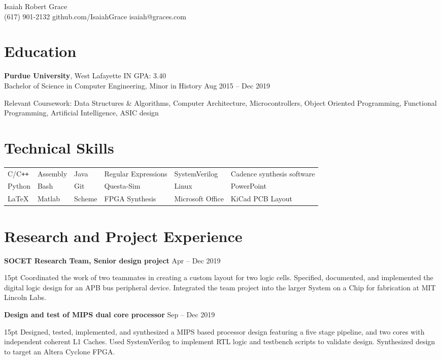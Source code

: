\documentclass[10pt,letterpaper]{article}
\newcommand{\resumeItem}[3]{
	\textbf{#1} \hfill #2\\
	\begin{adjustwidth}{15pt}{}
	#3
	\end{adjustwidth}
}
\begin{document}
\raggedright
\begin{center}
	\Huge{Isaiah Robert Grace}\\
	\vspace{6pt}
	\large{(617) 901-2132 \hfill github.com/IsaiahGrace \hfill isaiah@graces.com}
\end{center}

\section*{Education}
\textbf{Purdue University}, West Lafayette IN \hfill GPA: 3.40\\
Bachelor of Science in Computer Engineering, Minor in History \hfill Aug 2015 -- Dec 2019

\vspace{2pt}
Relevant Coursework:
Data Structures \& Algorithms,
Computer Architecture,
Microcontrollers,
Object Oriented Programming,
Functional Programming,
Artificial Intelligence,
ASIC design


\section*{Technical Skills}
\begin{tabular*}{\textwidth}{llllll}
	C/C\texttt{++} & Assembly & Java   & Regular Expressions & SystemVerilog    & Cadence synthesis software\\
 	Python         & Bash     & Git    & Questa-Sim          & Linux            & PowerPoint\\
 	\LaTeX         & Matlab   & Scheme & FPGA Synthesis      & Microsoft Office & KiCad PCB Layout\\
\end{tabular*}


\section*{Research and Project Experience}
\resumeItem
{SOCET Research Team, Senior design project}
{Apr -- Dec 2019}
{Coordinated the work of two teammates in creating a custom layout for two logic cells. Specified, documented, and implemented the digital logic design for an APB bus peripheral device. Integrated the team project into the larger System on a Chip for fabrication at MIT Lincoln Labs.}

\resumeItem
{Design and test of MIPS dual core processor}
{Sep -- Dec 2019}
{Designed, tested, implemented, and synthesized a MIPS based processor design featuring a five stage pipeline, and two cores with independent coherent L1 Caches. Used SystemVerilog to implement RTL logic and testbench scripts to validate design. Synthesized design to target an Altera Cyclone FPGA.}
\end{document}
